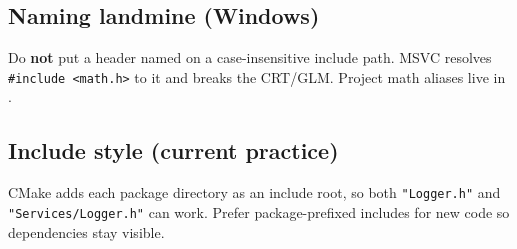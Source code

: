 \subsection{Naming landmine (Windows)}
\begin{decisionbox}[title={Decision: MathTypes.h (2026-07-28)}]
Do \textbf{not} put a header named  on a case-insensitive include
path. MSVC resolves \texttt{\#include <math.h>} to it and breaks the CRT/GLM.
Project math aliases live in .
\end{decisionbox}

\subsection{Include style (current practice)}
\begin{statusbox}
CMake adds each package directory as an include root, so both
\texttt{"Logger.h"} and \texttt{"Services/Logger.h"} can work.
Prefer package-prefixed includes for new code so dependencies stay visible.
\end{statusbox}
